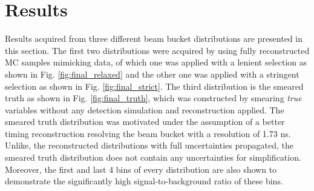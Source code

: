 \section{Results}
\label{sec:result}

Results acquired from three different beam bucket distributions are presented in this section.
The first two distributions were acquired by using fully reconstructed MC samples mimicking data, of which one 
was applied with a lenient selection as shown in Fig. \ref{fig:final_relaxed} and the other one was applied with a stringent selection as shown in Fig. \ref{fig:final_strict}.
The third distribution is the smeared truth as shown in Fig. \ref{fig:final_truth}, which was constructed by smearing \textit{true} variables without any detection simulation and reconstruction applied.
The smeared truth distribution was motivated under the assumption of a better timing reconstruction resolving the beam bucket with a resolution of 1.73 ns.
Unlike, the reconstructed distributions with full uncertainties propagated, the smeared truth distribution does not contain any uncertainties for simplification. 
Moreover, the first and last 4 bins of every distribution are also shown to demonstrate the significantly high signal-to-background ratio of these bins.

